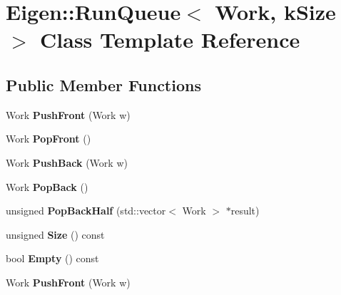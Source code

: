 \hypertarget{class_eigen_1_1_run_queue}{}\section{Eigen\+:\+:Run\+Queue$<$ Work, k\+Size $>$ Class Template Reference}
\label{class_eigen_1_1_run_queue}
\subsection*{Public Member Functions}
\begin{DoxyCompactItemize}
\item 
\mbox{\label{class_eigen_1_1_run_queue_aa176e6edcabac0e168f579a968eeb49f}} 
Work {\bfseries Push\+Front} (Work w)
\item 
\mbox{\label{class_eigen_1_1_run_queue_a70485d807cb89b34d882471f069eeeea}} 
Work {\bfseries Pop\+Front} ()
\item 
\mbox{\label{class_eigen_1_1_run_queue_a205fedbfce51498cde3069171ff4790d}} 
Work {\bfseries Push\+Back} (Work w)
\item 
\mbox{\label{class_eigen_1_1_run_queue_a5f0a65d40022baef3d77abb8226f35b0}} 
Work {\bfseries Pop\+Back} ()
\item 
\mbox{\label{class_eigen_1_1_run_queue_a583d558af80e41729d7808ed5dfa25d9}} 
unsigned {\bfseries Pop\+Back\+Half} (std\+::vector$<$ Work $>$ $\ast$result)
\item 
\mbox{\label{class_eigen_1_1_run_queue_aa193d3baea623281da1886603799dd87}} 
unsigned {\bfseries Size} () const
\item 
\mbox{\label{class_eigen_1_1_run_queue_aa7abe7eea034f24a03843b90109636dc}} 
bool {\bfseries Empty} () const
\item 
\mbox{\label{class_eigen_1_1_run_queue_aa176e6edcabac0e168f579a968eeb49f}} 
Work {\bfseries Push\+Front} (Work w)
\item 

\end{DoxyCompactItemize}

